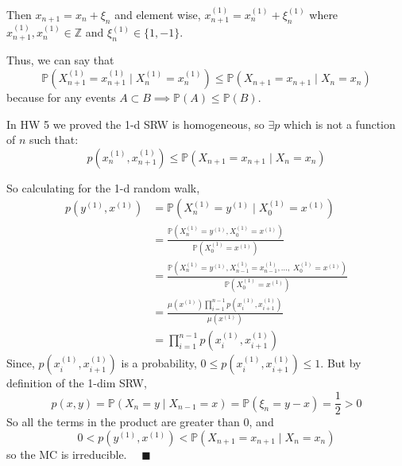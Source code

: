 \documentclass[12pt]{article}
\renewcommand{\P}{\mathbb{P}}
\newcommand{\Z}{\mathbb{Z}}
\newcommand{\qed}{\quad \blacksquare}
\begin{document}
        Then $x_{n+1} = x_n + \xi_n$ and element wise, $x_{n+1}^{(1)} = x_{n}^{(1)} + \xi_n^{(1)}$ where $x_{n+1}^{(1)}, x_{n}^{(1)} \in \Z$ and $\xi_n^{(1)} \in \{1, -1\}$.

        Thus, we can say that 
        \[\P(X_{n+1}^{(1)} = x_{n+1}^{(1)} \; | \; X_n^{(1)} = x_n^{(1)}) \leq \P(X_{n+1} = x_{n+1} \; | \; X_n = x_n)\]
        because for any events $A \subset B \implies \P(A) \leq \P(B)$. 

        In HW 5 we proved the 1-d SRW is homogeneous, so $\exists p$ which is not a function of $n$ such that:  
        \[p(x_{n}^{(1)}, x_{n+1}^{(1)}) \leq \P(X_{n+1} = x_{n+1} \; | \; X_n = x_n)\]

        So calculating for the 1-d random walk,
        \begin{align*}
            p(y^{(1)}, x^{(1)}) &= \P(X_n^{(1)} = y^{(1)} \; | \; X_0^{(1)} = x^{(1)})\\
            &= \frac{\P(X_n^{(1)} = y^{(1)}, X_0^{(1)} = x^{(1)})}{\P(X_0^{(1)} = x^{(1)})}\\
            &= \frac{\P(X_n^{(1)} = y^{(1)}, X_{n-1}^{(1)} = x_{n-1}^{(1)}, \dots, \; X_0^{(1)} = x^{(1)})}{\P(X_0^{(1)} = x^{(1)})}\\
            &= \frac{\mu(x^{(1)}) \prod_{i=1}^{n-1} p(x_i^{(1)}, x_{i+1}^{(1)})}{\mu(x^{(1)})}\\
            &= \prod_{i=1}^{n-1} p(x_i^{(1)}, x_{i+1}^{(1)})
        \end{align*}
        Since, $p(x_i^{(1)}, x_{i+1}^{(1)})$ is a probability, $0 \leq p(x_i^{(1)}, x_{i+1}^{(1)}) \leq 1$. But by definition of the 1-dim SRW, 
        \[p(x, y) = \P(X_n = y \; | \; X_{n-1} = x) = \P(\xi_n = y - x) = \frac{1}{2} > 0\]
        So all the terms in the product are greater than $0$, and
        \[0 <  p(y^{(1)}, x^{(1)}) < \P(X_{n+1} = x_{n+1} \; | \; X_n = x_n)\]
        so the MC is irreducible. $\qed$
    \color{black}
\end{document}
